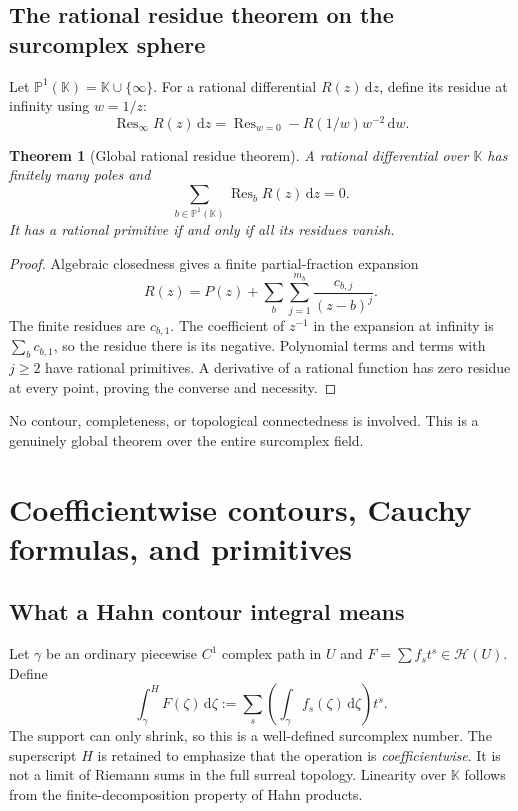 \documentclass[11pt,oneside]{article}
\numberwithin{equation}{section}
\newtheorem{theorem}{Theorem}[section]
\theoremstyle{definition}
\theoremstyle{remark}\newtheorem{remark}[theorem]{Remark}
\newcommand{\K}{\mathbb K}
\newcommand{\HH}{\mathscr H}
\newcommand{\Res}{\operatorname{Res}}
\newcommand{\hint}{\mathop{\int}\nolimits^{\!H}}
\newcommand{\dd}{\,\mathrm d}
\begin{document}
\subsection{The rational residue theorem on the surcomplex sphere}
Let $\mathbb P^1(\K)=\K\cup\{\infty\}$. For a rational differential
$R(z)\dd z$, define its residue at infinity using $w=1/z$:
\[
 \Res_\infty R(z)\dd z
 =\Res_{w=0}-R(1/w)w^{-2}\dd w.
\]
\begin{theorem}[Global rational residue theorem]\label{thm:rational-residue}
A rational differential over $\K$ has finitely many poles and
\[
 \sum_{b\in\mathbb P^1(\K)}\Res_b R(z)\dd z=0.
\]
It has a rational primitive if and only if all its residues vanish.
\end{theorem}
\begin{proof}
Algebraic closedness gives a finite partial-fraction expansion
\[
 R(z)=P(z)+\sum_{b}\sum_{j=1}^{m_b}\frac{c_{b,j}}{(z-b)^j}.
\]
The finite residues are $c_{b,1}$. The coefficient of $z^{-1}$ in the
expansion at infinity is $\sum_b c_{b,1}$, so the residue there is its
negative. Polynomial terms and terms with $j\geq2$ have rational
primitives. A derivative of a rational function has zero residue at every
point, proving the converse and necessity.
\end{proof}
No contour, completeness, or topological connectedness is involved.
This is a genuinely global theorem over the entire surcomplex field.

\section{Coefficientwise contours, Cauchy formulas, and primitives}
\subsection{What a Hahn contour integral means}
Let $\gamma$ be an ordinary piecewise $C^1$ complex path in $U$ and
$F=\sum f_s t^s\in\HH(U)$. Define
\begin{equation}\label{eq:Hintegral}
 \hint_\gamma F(\zeta)\dd\zeta
  :=\sum_s\left(\int_\gamma f_s(\zeta)\dd\zeta\right)t^s.
\end{equation}
The support can only shrink, so this is a well-defined surcomplex number.
The superscript $H$ is retained to emphasize that the operation is
\emph{coefficientwise}. It is not a limit of Riemann sums in the full
surreal topology. Linearity over $\K$ follows from the finite-decomposition
property of Hahn products.
\end{document}
